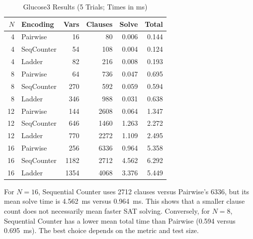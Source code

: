 \documentclass[conference]{IEEEtran}
\begin{document}
\begin{table}[htbp]
    \caption{Glucose3 Results (5 Trials; Times in ms)}
    \label{tab:queen_sat}
    \centering\scriptsize
    \setlength{\tabcolsep}{3pt}
    \begin{tabular}{r l r r r r}
        \hline
        \(N\) & Encoding   & Vars & Clauses & Solve & Total \\
        \hline
        4     & Pairwise   & 16   & 80      & 0.006 & 0.144 \\
        4     & SeqCounter & 54   & 108     & 0.004 & 0.124 \\
        4     & Ladder     & 82   & 216     & 0.008 & 0.193 \\
        8     & Pairwise   & 64   & 736     & 0.047 & 0.695 \\
        8     & SeqCounter & 270  & 592     & 0.059 & 0.594 \\
        8     & Ladder     & 346  & 988     & 0.031 & 0.638 \\
        12    & Pairwise   & 144  & 2608    & 0.064 & 1.347 \\
        12    & SeqCounter & 646  & 1460    & 1.263 & 2.272 \\
        12    & Ladder     & 770  & 2272    & 1.109 & 2.495 \\
        16    & Pairwise   & 256  & 6336    & 0.964 & 5.358 \\
        16    & SeqCounter & 1182 & 2712    & 4.562 & 6.292 \\
        16    & Ladder     & 1354 & 4068    & 3.376 & 5.449 \\
        \hline
    \end{tabular}
\end{table}

For \(N=16\), Sequential Counter uses 2712 clauses versus Pairwise's 6336, but its mean solve time is 4.562~ms versus 0.964~ms. This shows that a smaller clause count does not necessarily mean faster SAT solving. Conversely, for \(N=8\), Sequential Counter has a lower mean total time than Pairwise (0.594 versus 0.695~ms). The best choice depends on the metric and test size.
\end{document}

